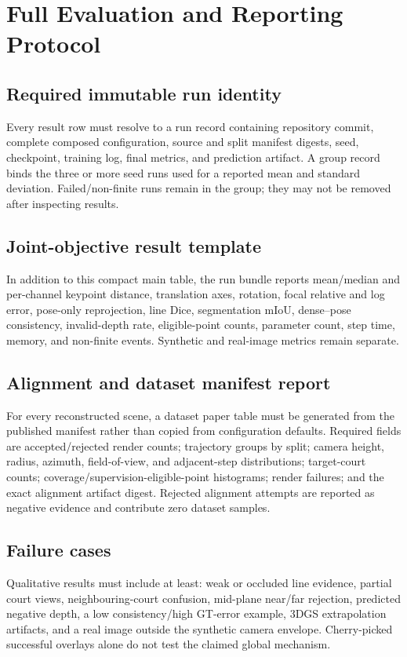 \section{Full Evaluation and Reporting Protocol}
\label{app:evaluation}

\subsection{Required immutable run identity}

Every result row must resolve to a run record containing repository commit,
complete composed configuration, source and split manifest digests, seed,
checkpoint, training log, final metrics, and prediction artifact.  A group
record binds the three or more seed runs used for a reported mean and standard
deviation.  Failed/non-finite runs remain in the group; they may not be removed
after inspecting results.

\subsection{Joint-objective result template}



In addition to this compact main table, the run bundle reports mean/median and
per-channel keypoint distance, translation axes, rotation, focal relative and
log error, pose-only reprojection, line Dice, segmentation mIoU, dense--pose
consistency, invalid-depth rate, eligible-point counts, parameter count, step
time, memory, and non-finite events.  Synthetic and real-image metrics remain
separate.

\subsection{Alignment and dataset manifest report}

For every reconstructed scene, a dataset paper table must be generated from the
published manifest rather than copied from configuration defaults.  Required
fields are accepted/rejected render counts; trajectory groups by split; camera
height, radius, azimuth, field-of-view, and adjacent-step distributions;
target-court counts; coverage/supervision-eligible-point histograms; render failures; and
the exact alignment artifact digest.  Rejected alignment attempts are reported
as negative evidence and contribute zero dataset samples.

\subsection{Failure cases}

Qualitative results must include at least: weak or occluded line evidence,
partial court views, neighbouring-court confusion, mid-plane near/far
rejection, predicted negative depth, a low consistency/high GT-error example,
3DGS extrapolation artifacts, and a real image outside the synthetic camera
envelope.  Cherry-picked successful overlays alone do not test the claimed
global mechanism.
